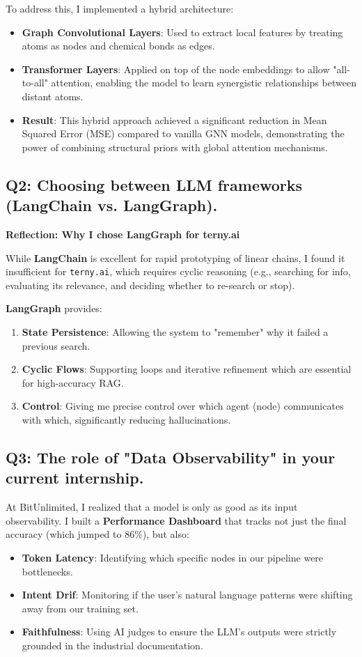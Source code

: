 \documentclass[12pt,a4paper]{article}
\begin{document}
To address this, I implemented a hybrid architecture:
\begin{itemize}
    \item \textbf{Graph Convolutional Layers}: Used to extract local features by treating atoms as nodes and chemical bonds as edges.
    \item \textbf{Transformer Layers}: Applied on top of the node embeddings to allow "all-to-all" attention, enabling the model to learn synergistic relationships between distant atoms.
    \item \textbf{Result}: This hybrid approach achieved a significant reduction in Mean Squared Error (MSE) compared to vanilla GNN models, demonstrating the power of combining structural priors with global attention mechanisms.
\end{itemize}

\subsection*{Q2: Choosing between LLM frameworks (LangChain vs. LangGraph).}

\textbf{Reflection: Why I chose LangGraph for terny.ai}

While \textbf{LangChain} is excellent for rapid prototyping of linear chains, I found it insufficient for \texttt{terny.ai}, which requires cyclic reasoning (e.g., searching for info, evaluating its relevance, and deciding whether to re-search or stop).

\textbf{LangGraph} provides:
\begin{enumerate}
    \item \textbf{State Persistence}: Allowing the system to "remember" why it failed a previous search.
    \item \textbf{Cyclic Flows}: Supporting loops and iterative refinement which are essential for high-accuracy RAG.
    \item \textbf{Control}: Giving me precise control over which agent (node) communicates with which, significantly reducing hallucinations.
\end{enumerate}

\subsection*{Q3: The role of "Data Observability" in your current internship.}

At BitUnlimited, I realized that a model is only as good as its input observability. I built a \textbf{Performance Dashboard} that tracks not just the final accuracy (which jumped to 86\%), but also:
\begin{itemize}
    \item \textbf{Token Latency}: Identifying which specific nodes in our pipeline were bottlenecks.
    \item \textbf{Intent Drif}: Monitoring if the user's natural language patterns were shifting away from our training set.
    \item \textbf{Faithfulness}: Using AI judges to ensure the LLM's outputs were strictly grounded in the industrial documentation.
\end{itemize}
\end{document}

